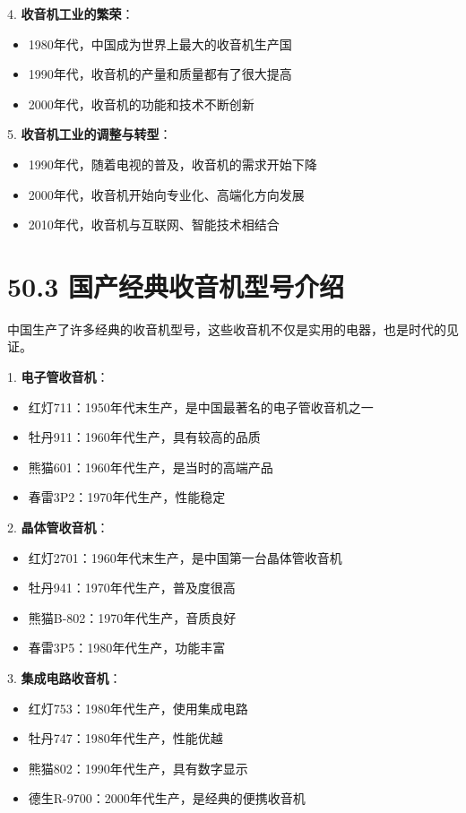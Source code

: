 \documentclass[12pt,UTF8]{ctexbook}
\begin{document}
4. \textbf{收音机工业的繁荣}：
   \begin{itemize}[leftmargin=3.5em]
   \item 1980年代，中国成为世界上最大的收音机生产国
   \item 1990年代，收音机的产量和质量都有了很大提高
   \item 2000年代，收音机的功能和技术不断创新
   \end{itemize}

5. \textbf{收音机工业的调整与转型}：
   \begin{itemize}[leftmargin=3.5em]
   \item 1990年代，随着电视的普及，收音机的需求开始下降
   \item 2000年代，收音机开始向专业化、高端化方向发展
   \item 2010年代，收音机与互联网、智能技术相结合
   \end{itemize}

\section*{50.3 国产经典收音机型号介绍}

中国生产了许多经典的收音机型号，这些收音机不仅是实用的电器，也是时代的见证。

1. \textbf{电子管收音机}：
   \begin{itemize}[leftmargin=3.5em]
   \item 红灯711：1950年代末生产，是中国最著名的电子管收音机之一
   \item 牡丹911：1960年代生产，具有较高的品质
   \item 熊猫601：1960年代生产，是当时的高端产品
   \item 春雷3P2：1970年代生产，性能稳定
   \end{itemize}

2. \textbf{晶体管收音机}：
   \begin{itemize}[leftmargin=3.5em]
   \item 红灯2701：1960年代末生产，是中国第一台晶体管收音机
   \item 牡丹941：1970年代生产，普及度很高
   \item 熊猫B-802：1970年代生产，音质良好
   \item 春雷3P5：1980年代生产，功能丰富
   \end{itemize}

3. \textbf{集成电路收音机}：
   \begin{itemize}[leftmargin=3.5em]
   \item 红灯753：1980年代生产，使用集成电路
   \item 牡丹747：1980年代生产，性能优越
   \item 熊猫802：1990年代生产，具有数字显示
   \item 德生R-9700：2000年代生产，是经典的便携收音机
   \end{itemize}
\end{document}
